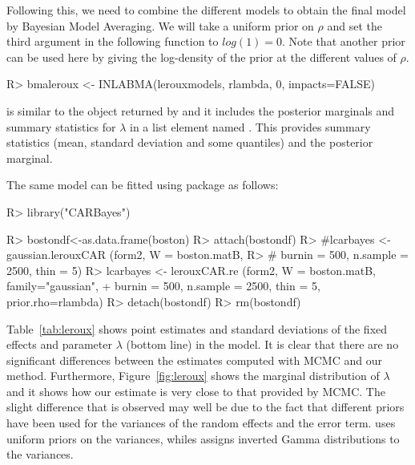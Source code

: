 \documentclass[article]{jss}
\begin{document}
Following this, we need to combine the different models to obtain the final
model by Bayesian Model Averaging. We will take a uniform prior on $\rho$ and
set the third argument in the following function to $log(1)=0$. Note that
another prior can be used here by giving the log-density of the prior at the
different values of $\rho$.



\begin{Schunk}
\begin{Sinput}
R> bmaleroux <- INLABMA(lerouxmodels, rlambda, 0, impacts=FALSE)
\end{Sinput}
\end{Schunk}


\noindent
{} is similar to the object returned by  and it
includes the posterior marginals and summary statistics for $\lambda$
in a list element named . This provides summary statistics (mean,
standard deviation and some quantiles) and the posterior marginal.

The same model can be fitted using package  \citep{CARBayes:2013}
as follows:

\begin{Schunk}
\begin{Sinput}
R> library("CARBayes")
\end{Sinput}
\end{Schunk}
\begin{Schunk}
\begin{Sinput}
R> bostondf<-as.data.frame(boston)
R> attach(bostondf)
R> #lcarbayes <-  gaussian.lerouxCAR (form2, W = boston.matB,
R> #   burnin = 500,  n.sample = 2500, thin = 5)
R> lcarbayes <-  lerouxCAR.re (form2, W = boston.matB, family="gaussian",
+     burnin = 500,  n.sample = 2500, thin = 5, prior.rho=rlambda)
R> detach(bostondf)
R> rm(bostondf)
\end{Sinput}
\end{Schunk}


Table~\ref{tab:leroux} shows point estimates and standard deviations of the
fixed effects and parameter $\lambda$ (bottom line) in the model. It is clear
that there are no significant differences between the estimates computed with
MCMC and our method.  Furthermore, Figure~\ref{fig:leroux} shows the marginal
distribution of $\lambda$ and it shows how our estimate is very close to that
provided by MCMC. The slight difference that is observed may well be due to the
fact that different priors have been used for the variances of the random
effects and the error term.  uses uniform priors on the variances,
whiles  assigns inverted Gamma distributions to the variances.
\end{document}
